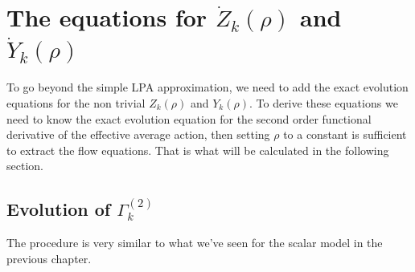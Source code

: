 \section{The equations for $\dot{Z}_k(\rho)$ and $\dot{Y}_k(\rho)$}
To go beyond the simple LPA approximation, we need to add the exact evolution equations for the non trivial $Z_k(\rho)$ and $Y_k(\rho)$. 
To derive these equations we need to know the exact evolution equation for the second order functional derivative of the effective average action,
then setting $\rho$ to a constant is sufficient to extract the flow equations.
That is what will be calculated in the following section.

\subsection{Evolution of $\Gamma_k^{(2)}$}
The procedure is very similar to what we've seen for the scalar model in the previous chapter.

